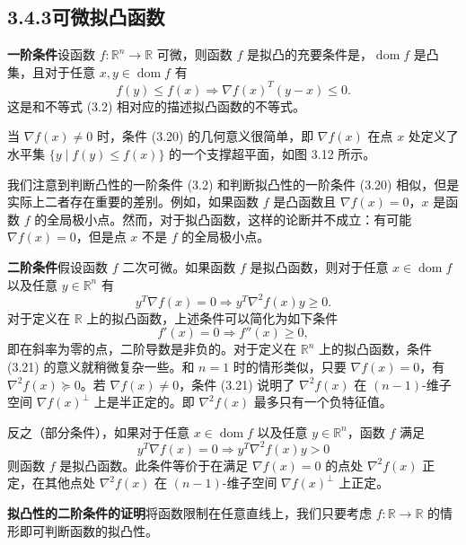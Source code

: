 \documentclass[UTF8,12pt,a4paper,fontset=fandol]{ctexart}
\DeclareMathOperator{\dom}{dom}
\begin{document}
\subsection*{3.4.3\quad 可微拟凸函数}

\noindent\textbf{一阶条件}\quad 设函数 $f:\mathbb{R}^n\to\mathbb{R}$ 可微，则函数 $f$ 是拟凸的充要条件是，$\dom f$ 是凸集，且对于任意 $x,y\in\dom f$ 有
\begin{equation}
f(y)\leq f(x)\Longrightarrow \nabla f(x)^T(y-x)\leq0.
\tag{3.20}
\end{equation}
这是和不等式 (3.2) 相对应的描述拟凸函数的不等式。

当 $\nabla f(x)\neq0$ 时，条件 (3.20) 的几何意义很简单，即 $\nabla f(x)$ 在点 $x$ 处定义了水平集 $\{y\mid f(y)\leq f(x)\}$ 的一个支撑超平面，如图 3.12 所示。

我们注意到判断凸性的一阶条件 (3.2) 和判断拟凸性的一阶条件 (3.20) 相似，但是实际上二者存在重要的差别。例如，如果函数 $f$ 是凸函数且 $\nabla f(x)=0$，$x$ 是函数 $f$ 的全局极小点。然而，对于拟凸函数，这样的论断并不成立：有可能 $\nabla f(x)=0$，但是点 $x$ 不是 $f$ 的全局极小点。

\noindent\textbf{二阶条件}\quad 假设函数 $f$ 二次可微。如果函数 $f$ 是拟凸函数，则对于任意 $x\in\dom f$ 以及任意 $y\in\mathbb{R}^n$ 有
\begin{equation}
y^T\nabla f(x)=0\Longrightarrow y^T\nabla^2f(x)y\geq0.
\tag{3.21}
\end{equation}
对于定义在 $\mathbb{R}$ 上的拟凸函数，上述条件可以简化为如下条件
\[
f'(x)=0\Longrightarrow f''(x)\geq0,
\]
即在斜率为零的点，二阶导数是非负的。对于定义在 $\mathbb{R}^n$ 上的拟凸函数，条件 (3.21) 的意义就稍微复杂一些。和 $n=1$ 时的情形类似，只要 $\nabla f(x)=0$，有 $\nabla^2 f(x)\succeq0$。若 $\nabla f(x)\neq0$，条件 (3.21) 说明了 $\nabla^2f(x)$ 在 $(n-1)$-维子空间 $\nabla f(x)^\perp$ 上是半正定的。即 $\nabla^2f(x)$ 最多只有一个负特征值。

反之（部分条件），如果对于任意 $x\in\dom f$ 以及任意 $y\in\mathbb{R}^n$，函数 $f$ 满足
\begin{equation}
y^T\nabla f(x)=0\Longrightarrow y^T\nabla^2f(x)y>0
\tag{3.22}
\end{equation}
则函数 $f$ 是拟凸函数。此条件等价于在满足 $\nabla f(x)=0$ 的点处 $\nabla^2f(x)$ 正定，在其他点处 $\nabla^2f(x)$ 在 $(n-1)$-维子空间 $\nabla f(x)^\perp$ 上正定。

\noindent\textbf{拟凸性的二阶条件的证明}\quad 将函数限制在任意直线上，我们只要考虑 $f:\mathbb{R}\to\mathbb{R}$ 的情形即可判断函数的拟凸性。
\end{document}
